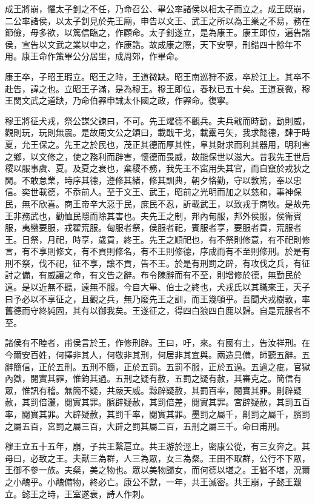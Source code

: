 成王將崩，懼太子釗之不任，乃命召公、畢公率諸侯以相太子而立之。成王既崩，二公率諸侯，以太子釗見於先王廟，申告以文王、武王之所以為王業之不易，務在節儉，毋多欲，以篤信臨之，作顧命。太子釗遂立，是為康王。康王即位，遍告諸侯，宣告以文武之業以申之，作康誥。故成康之際，天下安寧，刑錯四十餘年不用。康王命作策畢公分居里，成周郊，作畢命。

康王卒，子昭王瑕立。昭王之時，王道微缺。昭王南巡狩不返，卒於江上。其卒不赴告，諱之也。立昭王子滿，是為穆王。穆王即位，春秋已五十矣。王道衰微，穆王閔文武之道缺，乃命伯臩申誡太仆國之政，作臩命。復寧。

穆王將征犬戎，祭公謀父諫曰，不可。先王燿德不觀兵。夫兵戢而時動，動則威，觀則玩，玩則無震。是故周文公之頌曰，載戢干戈，載櫜弓矢，我求懿德，肆于時夏，允王保之。先王之於民也，茂正其德而厚其性，阜其財求而利其器用，明利害之鄉，以文修之，使之務利而辟害，懷德而畏威，故能保世以滋大。昔我先王世后稷以服事虞、夏。及夏之衰也，棄稷不務，我先王不窋用失其官，而自竄於戎狄之閒。不敢怠業，時序其德，遵修其緒，修其訓典，朝夕恪勤，守以敦篤，奉以忠信。奕世載德，不忝前人。至于文王、武王，昭前之光明而加之以慈和，事神保民，無不欣喜。商王帝辛大惡于民，庶民不忍，訢載武王，以致戎于商牧。是故先王非務武也，勸恤民隱而除其害也。夫先王之制，邦內甸服，邦外侯服，侯衛賓服，夷蠻要服，戎翟荒服。甸服者祭，侯服者祀，賓服者享，要服者貢，荒服者王。日祭，月祀，時享，歲貢，終王。先王之順祀也，有不祭則修意，有不祀則修言，有不享則修文，有不貢則修名，有不王則修德，序成而有不至則修刑。於是有刑不祭，伐不祀，征不享，讓不貢，告不王。於是有刑罰之辟，有攻伐之兵，有征討之備，有威讓之命，有文告之辭。布令陳辭而有不至，則增修於德，無勤民於遠。是以近無不聽，遠無不服。今自大畢、伯士之終也，犬戎氏以其職來王，天子曰予必以不享征之，且觀之兵，無乃廢先王之訓，而王幾頓乎。吾聞犬戎樹敦，率舊德而守終純固，其有以御我矣。王遂征之，得四白狼四白鹿以歸。自是荒服者不至。

諸侯有不睦者，甫侯言於王，作修刑辟。王曰，吁，來。有國有土，告汝祥刑。在今爾安百姓，何擇非其人，何敬非其刑，何居非其宜與。兩造具備，師聽五辭。五辭簡信，正於五刑。五刑不簡，正於五罰。五罰不服，正於五過。五過之疵，官獄內獄，閱實其罪，惟鈞其過。五刑之疑有赦，五罰之疑有赦，其審克之。簡信有眾，惟訊有稽。無簡不疑，共嚴天威。黥辟疑赦，其罰百率，閱實其罪。劓辟疑赦，其罰倍灑，閱實其罪。臏辟疑赦，其罰倍差，閱實其罪。宮辟疑赦，其罰五百率，閱實其罪。大辟疑赦，其罰千率，閱實其罪。墨罰之屬千，劓罰之屬千，臏罰之屬五百，宮罰之屬三百，大辟之罰其屬二百，五刑之屬三千。命曰甫刑。

穆王立五十五年，崩，子共王繄扈立。共王游於涇上，密康公從，有三女奔之。其母曰，必致之王。夫獸三為群，人三為眾，女三為粲。王田不取群，公行不下眾，王御不參一族。夫粲，美之物也。眾以美物歸女，而何德以堪之。王猶不堪，況爾之小醜乎。小醜備物，終必亡。康公不獻，一年，共王滅密。共王崩，子懿王艱立。懿王之時，王室遂衰，詩人作刺。

